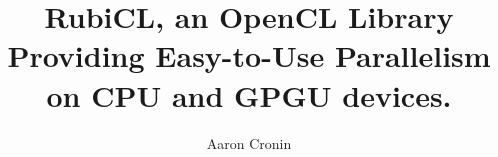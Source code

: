 \title{RubiCL, an OpenCL Library Providing Easy-to-Use Parallelism on CPU and GPGU devices.}

\author{Aaron Cronin}



